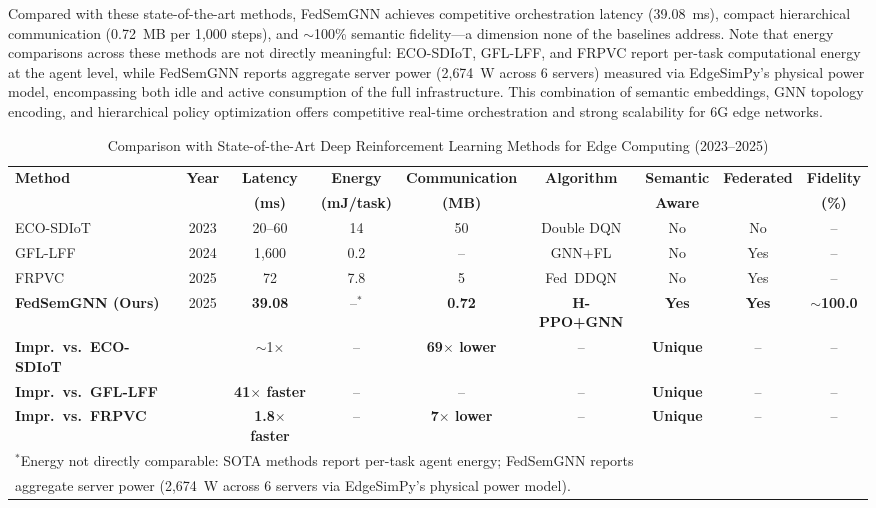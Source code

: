 \documentclass[conference]{IEEEtran}
\begin{document}
	\textcolor{revblue}{Compared with these state-of-the-art methods, FedSemGNN achieves competitive orchestration latency (39.08~ms), compact hierarchical communication (0.72~MB per 1{,}000 steps), and $\sim$100\% semantic fidelity---a dimension none of the baselines address.}
	\textcolor{revblue}{Note that energy comparisons across these methods are not directly meaningful: ECO-SDIoT, GFL-LFF, and FRPVC report per-task computational energy at the agent level, while FedSemGNN reports aggregate server power (2{,}674~W across 6 servers) measured via EdgeSimPy's physical power model, encompassing both idle and active consumption of the full infrastructure.}
	\textcolor{revblue}{This combination of semantic embeddings, GNN topology encoding, and hierarchical policy optimization offers competitive real-time orchestration and strong scalability for 6G edge networks.}
	
	\begin{table}[htbp]
		\centering
		\caption{Comparison with State-of-the-Art Deep Reinforcement Learning Methods for Edge Computing (2023--2025)}
		\label{tab:sota_comparison}
		\small
		\begin{tabular}{lcccccccc}
			\toprule
			\textbf{Method} & \textbf{Year} & \textbf{Latency} & \textbf{Energy} & \textbf{Communication} & \textbf{Algorithm} & \textbf{Semantic} & \textbf{Federated} & \textbf{Fidelity} \\
			& & \textbf{(ms)} & \textbf{(mJ/task)} & \textbf{(MB)} & & \textbf{Aware} & & \textbf{(\%)} \\
			\midrule
			ECO-SDIoT~\cite{zhu2023eco} & 2023 & 20--60 & 14 & 50 & Double DQN & No & No & -- \\
			GFL-LFF~\cite{regan2024gfl} & 2024 & 1{,}600 & 0.2 & -- & GNN+FL & No & Yes & -- \\
			FRPVC~\cite{qian2025frpvc} & 2025 & 72 & 7.8 & 5 & Fed~DDQN & No & Yes & -- \\
			\midrule
			\textbf{FedSemGNN (Ours)} & 2025 & \textbf{39.08} & --$^*$ & \textbf{0.72} & \textbf{H-PPO+GNN} & \textbf{Yes} & \textbf{Yes} & \textbf{$\sim$100.0} \\
			\midrule
			\textbf{Impr.\ vs.\ ECO-SDIoT} & & {$\sim$1$\times$} & -- & \textbf{69$\times$ lower} & -- & \textbf{Unique} & -- & -- \\
			\textbf{Impr.\ vs.\ GFL-LFF} & & \textbf{41$\times$ faster} & -- & -- & -- & \textbf{Unique} & -- & -- \\
			\textbf{Impr.\ vs.\ FRPVC} & & \textbf{1.8$\times$ faster} & -- & \textbf{7$\times$ lower} & -- & \textbf{Unique} & -- & -- \\
			\bottomrule
			\multicolumn{9}{l}{\footnotesize $^*$Energy not directly comparable: SOTA methods report per-task agent energy; FedSemGNN reports}\\
			\multicolumn{9}{l}{\footnotesize \phantom{$^*$}aggregate server power (2{,}674~W across 6 servers via EdgeSimPy's physical power model).}\\
		\end{tabular}
	\end{table}
	
\end{document}
